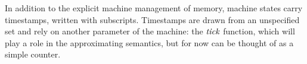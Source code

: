 In addition to the explicit machine management of memory, machine
states carry timestamps, written with subscripts.  Timestamps are
drawn from an unspecified set and rely on another parameter of the
machine: the $\mathit{tick}$ function, which will play a role in the
approximating semantics, but for now can be thought of as a simple
counter.


%

%
%




